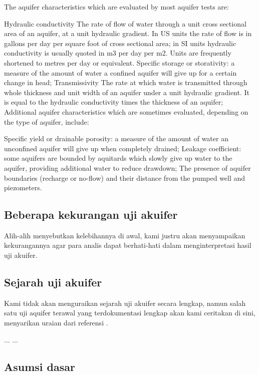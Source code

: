 The aquifer characteristics which are evaluated by most aquifer tests are:

Hydraulic conductivity The rate of flow of water through a unit cross sectional area of an aquifer, at a unit hydraulic gradient. In US units the rate of flow is in gallons per day per square foot of cross sectional area; in SI units hydraulic conductivity is usually quoted in m3 per day per m2. Units are frequently shortened to metres per day or equivalent.
Specific storage or storativity: a measure of the amount of water a confined aquifer will give up for a certain change in head;
Transmissivity The rate at which water is transmitted through whole thickness and unit width of an aquifer under a unit hydraulic gradient. It is equal to the hydraulic conductivity times the thickness of an aquifer;
Additional aquifer characteristics which are sometimes evaluated, depending on the type of aquifer, include:

Specific yield or drainable porosity: a measure of the amount of water an unconfined aquifer will give up when completely drained;
Leakage coefficient: some aquifers are bounded by aquitards which slowly give up water to the aquifer, providing additional water to reduce drawdown;
The presence of aquifer boundaries (recharge or no-flow) and their distance from the pumped well and piezometers.

\subsection{Beberapa kekurangan uji akuifer}

Alih-alih menyebutkan kelebihannya di awal, kami justru akan menyampaikan kekurangannya agar para analis dapat berhati-hati dalam menginterpretasi hasil uji akuifer.



\subsection{Sejarah uji akuifer}

Kami tidak akan menguraikan sejarah uji akuifer secara lengkap, namun salah satu uji aquifer terawal yang terdokumentasi lengkap akan kami ceritakan di sini, menyarikan uraian dari referensi \cite{kruseman1994analysis}.

...
...




\subsection{Asumsi dasar}

